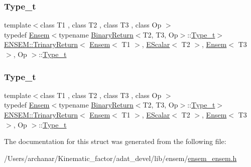 \subsubsection{\texorpdfstring{Type\_t}{Type\_t}\hspace{0.1cm}{\footnotesize\ttfamily [1/2]}}
{\footnotesize\ttfamily template$<$class T1 , class T2 , class T3 , class Op $>$ \\
typedef \mbox{\hyperlink{classENSEM_1_1Ensem}{Ensem}}$<$typename \mbox{\hyperlink{structENSEM_1_1BinaryReturn}{Binary\+Return}}$<$T2, T3, Op$>$\+::\mbox{\hyperlink{structENSEM_1_1TrinaryReturn_3_01Ensem_3_01T1_01_4_00_01EScalar_3_01T2_01_4_00_01Ensem_3_01T3_01_4_00_01Op_01_4_a14825153e818fbe1a3b3ab066e144cc4}{Type\+\_\+t}}$>$ \mbox{\hyperlink{structENSEM_1_1TrinaryReturn}{E\+N\+S\+E\+M\+::\+Trinary\+Return}}$<$ \mbox{\hyperlink{classENSEM_1_1Ensem}{Ensem}}$<$ T1 $>$, \mbox{\hyperlink{classENSEM_1_1EScalar}{E\+Scalar}}$<$ T2 $>$, \mbox{\hyperlink{classENSEM_1_1Ensem}{Ensem}}$<$ T3 $>$, Op $>$\+::\mbox{\hyperlink{structENSEM_1_1TrinaryReturn_3_01Ensem_3_01T1_01_4_00_01EScalar_3_01T2_01_4_00_01Ensem_3_01T3_01_4_00_01Op_01_4_a14825153e818fbe1a3b3ab066e144cc4}{Type\+\_\+t}}}

\mbox{\label{structENSEM_1_1TrinaryReturn_3_01Ensem_3_01T1_01_4_00_01EScalar_3_01T2_01_4_00_01Ensem_3_01T3_01_4_00_01Op_01_4_a14825153e818fbe1a3b3ab066e144cc4}} 
\subsubsection{\texorpdfstring{Type\_t}{Type\_t}\hspace{0.1cm}{\footnotesize\ttfamily [2/2]}}
{\footnotesize\ttfamily template$<$class T1 , class T2 , class T3 , class Op $>$ \\
typedef \mbox{\hyperlink{classENSEM_1_1Ensem}{Ensem}}$<$typename \mbox{\hyperlink{structENSEM_1_1BinaryReturn}{Binary\+Return}}$<$T2, T3, Op$>$\+::\mbox{\hyperlink{structENSEM_1_1TrinaryReturn_3_01Ensem_3_01T1_01_4_00_01EScalar_3_01T2_01_4_00_01Ensem_3_01T3_01_4_00_01Op_01_4_a14825153e818fbe1a3b3ab066e144cc4}{Type\+\_\+t}}$>$ \mbox{\hyperlink{structENSEM_1_1TrinaryReturn}{E\+N\+S\+E\+M\+::\+Trinary\+Return}}$<$ \mbox{\hyperlink{classENSEM_1_1Ensem}{Ensem}}$<$ T1 $>$, \mbox{\hyperlink{classENSEM_1_1EScalar}{E\+Scalar}}$<$ T2 $>$, \mbox{\hyperlink{classENSEM_1_1Ensem}{Ensem}}$<$ T3 $>$, Op $>$\+::\mbox{\hyperlink{structENSEM_1_1TrinaryReturn_3_01Ensem_3_01T1_01_4_00_01EScalar_3_01T2_01_4_00_01Ensem_3_01T3_01_4_00_01Op_01_4_a14825153e818fbe1a3b3ab066e144cc4}{Type\+\_\+t}}}



The documentation for this struct was generated from the following file\+:\begin{DoxyCompactItemize}
\item 
/\+Users/archanar/\+Kinematic\+\_\+factor/adat\+\_\+devel/lib/ensem/\mbox{\hyperlink{lib_2ensem_2ensem__ensem_8h}{ensem\+\_\+ensem.\+h}}\end{DoxyCompactItemize}
